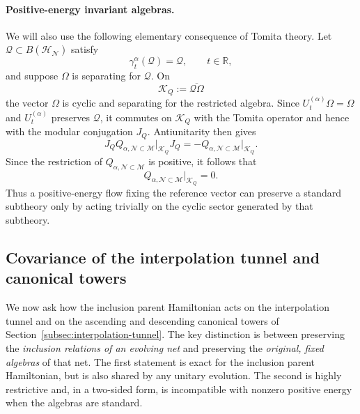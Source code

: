 \documentclass[a4paper,11pt]{article}
\theoremstyle{definition}
\newcommand{\mN}{\mathcal{N}}
\newcommand{\mH}{\mathcal{H}}
\newcommand{\mM}{\mathcal{M}}
\begin{document}
\paragraph{Positive-energy invariant algebras.}
We will also use the following elementary consequence of Tomita theory.
Let $\mathcal Q\subset B(\mH_{\mN})$ satisfy
\begin{equation}
    \gamma_t^\alpha(\mathcal Q)
    =
    \mathcal Q,
    \qquad
    t\in\mathbb R,
    \label{eq:Q-invariant-Halpha}
\end{equation}
and suppose $\Omega$ is separating for $\mathcal Q$. On
\begin{equation}
    \mathcal K_Q
    :=
    \overline{\mathcal Q\Omega}
\end{equation}
the vector $\Omega$ is cyclic and separating for the restricted algebra.
Since $U_t^{(\alpha)}\Omega=\Omega$ and
$U_t^{(\alpha)}$ preserves $\mathcal Q$, it commutes on
$\mathcal K_Q$ with the Tomita operator and hence with the modular
conjugation $J_Q$. Antiunitarity then gives
\begin{equation}
    J_Q
    Q_{\alpha,\mN\subset\mM}\big|_{\mathcal K_Q}
    J_Q
    =
    -
    Q_{\alpha,\mN\subset\mM}\big|_{\mathcal K_Q}.
\end{equation}
Since the restriction of $Q_{\alpha,\mN\subset\mM}$ is positive, it follows that
\begin{equation}
    \boxed{
    Q_{\alpha,\mN\subset\mM}\big|_{\mathcal K_Q}=0.
    }
    \label{eq:positive-H-invariant-Q}
\end{equation}
Thus a positive-energy flow fixing the reference vector can preserve a
standard subtheory only by acting trivially on the cyclic sector generated by
that subtheory.

\subsection{Covariance of the interpolation tunnel and canonical towers}
\label{subsec:Q-tower-covariance}

We now ask how the inclusion parent Hamiltonian acts on the
interpolation tunnel and on the ascending and descending canonical
towers of Section~\ref{subsec:interpolation-tunnel}. The key distinction
is between preserving the \emph{inclusion relations of an evolving net}
and preserving the \emph{original, fixed algebras} of that net.
The first statement is exact for the inclusion parent Hamiltonian,
but is also shared by any unitary evolution. The second is highly
restrictive and, in a two-sided form, is incompatible with nonzero
positive energy when the algebras are standard.
\end{document}
